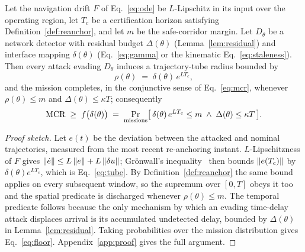\begin{theorem}
\label{thm:main}
Let the navigation drift $F$ of Eq.~\eqref{eq:ode} be $L$-Lipschitz in its input
over the operating region, let $T_c$ be a certification horizon satisfying
Definition~\ref{def:reanchor}, and let $m$ be the safe-corridor margin. Let
$D_\theta$ be a network detector with residual budget $\Delta(\theta)$
(Lemma~\ref{lem:residual}) and interface mapping $\delta(\theta)$
(Eq.~\eqref{eq:gamma} or the kinematic Eq.~\eqref{eq:staleness}). Then every attack
evading $D_\theta$ induces a trajectory-tube radius bounded by
\begin{equation}
\label{eq:tube}
\rho(\theta) \;=\; \delta(\theta)\,e^{L T_c},
\end{equation}
and the mission completes, in the conjunctive sense of Eq.~\eqref{eq:mcr},
whenever $\rho(\theta)\le m$ and $\Delta(\theta)\le\kappa T$; consequently
\begin{equation}
\label{eq:floor}
\mathrm{MCR} \;\ge\; f\big(\delta(\theta)\big) \;=\;
\Pr_{\text{missions}}\!\big[\,\delta(\theta)\,e^{LT_c}\le m
\;\wedge\; \Delta(\theta)\le\kappa T\,\big].
\end{equation}
\end{theorem}
\begin{proof}[Proof sketch]
Let $e(t)$ be the deviation between the attacked and nominal trajectories,
measured from the most recent re-anchoring instant. $L$-Lipschitzness of $F$
gives $\left\lVert \dot e\right\rVert\le L\left\lVert e\right\rVert+L\left\lVert \delta u\right\rVert$; Gr\"onwall's
inequality~\cite{gronwall1919} then bounds $\left\lVert e(T_c)\right\rVert$ by
$\delta(\theta)e^{LT_c}$, which is Eq.~\eqref{eq:tube}. By
Definition~\ref{def:reanchor} the same bound applies on every subsequent window,
so the supremum over $[0,T]$ obeys it too and the spatial
predicate is discharged whenever $\rho(\theta)\le m$. The temporal predicate follows because
the only mechanism by which an evading time-delay attack displaces arrival is
its accumulated undetected delay, bounded by $\Delta(\theta)$ in
Lemma~\ref{lem:residual}. Taking probabilities over the mission distribution
gives Eq.~\eqref{eq:floor}. Appendix~\ref{app:proof} gives the full argument.
\end{proof}

